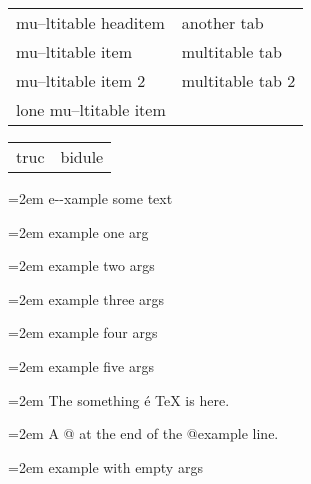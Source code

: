\documentclass{book}
\begin{document}
\begin{titlepage}
\begin{tabular}{m{} m{}}%
mu--ltitable headitem &another tab\\
mu--ltitable item &multitable tab\\
mu--ltitable item 2 &multitable tab 2
\index[cp]{index entry within multitable}%
\\
lone mu--ltitable item&\\
\end{tabular}%

\begin{tabular}{m{} m{}}%
truc &bidule\\
\end{tabular}%

\par\begingroup\obeylines\obeyspaces\frenchspacing\leftskip=2em\relax\parskip=0pt\relax\ttfamily{}%
e{-}{-}xample  some
   text
\endgroup{}%

\par\begingroup\obeylines\obeyspaces\frenchspacing\leftskip=2em\relax\parskip=0pt\relax\ttfamily{}%
example one arg
\endgroup{}%

\par\begingroup\obeylines\obeyspaces\frenchspacing\leftskip=2em\relax\parskip=0pt\relax\ttfamily{}%
example two args
\endgroup{}%

\par\begingroup\obeylines\obeyspaces\frenchspacing\leftskip=2em\relax\parskip=0pt\relax\ttfamily{}%
example three args
\endgroup{}%

\par\begingroup\obeylines\obeyspaces\frenchspacing\leftskip=2em\relax\parskip=0pt\relax\ttfamily{}%
example four args
\endgroup{}%

\par\begingroup\obeylines\obeyspaces\frenchspacing\leftskip=2em\relax\parskip=0pt\relax\ttfamily{}%
example five args
\endgroup{}%

\par\begingroup\obeylines\obeyspaces\frenchspacing\leftskip=2em\relax\parskip=0pt\relax\ttfamily{}%
The something \'{e} \TeX{} is here.
\endgroup{}%

\par\begingroup\obeylines\obeyspaces\frenchspacing\leftskip=2em\relax\parskip=0pt\relax\ttfamily{}%
A @ at the end of the @example line.
\endgroup{}%

\par\begingroup\obeylines\obeyspaces\frenchspacing\leftskip=2em\relax\parskip=0pt\relax\ttfamily{}%
example with empty args
\endgroup{}%


\end{titlepage}
\end{document}
